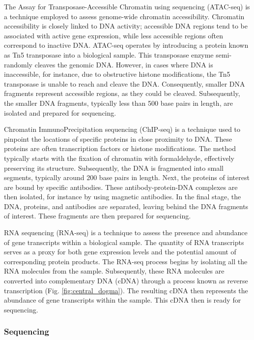 The Assay for Transposase-Accessible Chromatin using sequencing (ATAC-seq) is a technique employed to assess genome-wide chromatin accessibility\cite{Buenrostro_2015}. Chromatin accessibility is closely linked to DNA activity; accessible DNA regions tend to be associated with active gene expression, while less accessible regions often correspond to inactive DNA. ATAC-seq operates by introducing a protein known as Tn5 transposase into a biological sample. This transposase enzyme semi-randomly cleaves the genomic DNA. However, in cases where DNA is inaccessible, for instance, due to obstructive histone modifications, the Tn5 transposase is unable to reach and cleave the DNA. Consequently, smaller DNA fragments  represent accessible regions, as they could be cleaved. Subsequently, the smaller DNA fragments, typically less than 500 base pairs in length, are isolated and prepared for sequencing.

Chromatin ImmunoPrecipitation sequencing (ChIP-seq) is a technique used to pinpoint the locations of specific proteins in close proximity to DNA\cite{Robertson_2007}. These proteins are often transcription factors or histone modifications. The method typically starts with the fixation of chromatin with formaldehyde, effectively preserving its structure. Subsequently, the DNA is fragmented into small segments, typically around 200 base pairs in length. Next, the proteins of interest are bound by specific antibodies. These antibody-protein-DNA complexes are then isolated, for instance by using magnetic antibodies. In the final stage, the DNA, proteins, and antibodies are separated, leaving behind the DNA fragments of interest. These fragments are then prepared for sequencing.

RNA sequencing (RNA-seq) is a technique to assess the presence and abundance of gene transcripts within a biological sample\cite{Nagalakshmi2008}. The quantity of RNA transcripts serves as a proxy for both gene expression levels and the potential amount of corresponding protein products. The RNA-seq process begins by isolating all the RNA molecules from the sample. Subsequently, these RNA molecules are converted into complementary DNA (cDNA) through a process known as reverse transcription (Fig. \ref{fig:central_dogma}). The resulting cDNA then represents the abundance of gene transcripts within the sample. This cDNA then is ready for sequencing.

\subsubsection{Sequencing}

